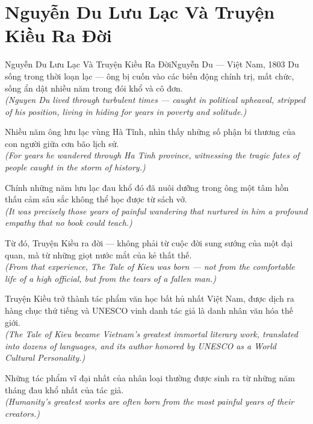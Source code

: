 \section{Nguyễn Du Lưu Lạc Và Truyện Kiều Ra Đời}
\begin{truyen}{Nguyễn Du Lưu Lạc Và Truyện Kiều Ra Đời}{Nguyễn Du --- Việt Nam, 1803}
 Du sống trong thời loạn lạc --- ông bị cuốn vào các biến động chính trị, mất chức, sống ẩn dật nhiều năm trong đói khổ và cô đơn.\\[4pt]
\textit{(Nguyen Du lived through turbulent times --- caught in political upheaval, stripped of his position, living in hiding for years in poverty and solitude.)}

Nhiều năm ông lưu lạc vùng Hà Tĩnh, nhìn thấy những số phận bi thương của con người giữa cơn bão lịch sử.\\[4pt]
\textit{(For years he wandered through Ha Tinh province, witnessing the tragic fates of people caught in the storm of history.)}

Chính những năm lưu lạc đau khổ đó đã nuôi dưỡng trong ông một tâm hồn thấu cảm sâu sắc không thể học được từ sách vở.\\[4pt]
\textit{(It was precisely those years of painful wandering that nurtured in him a profound empathy that no book could teach.)}

Từ đó, Truyện Kiều ra đời --- không phải từ cuộc đời sung sướng của một đại quan, mà từ những giọt nước mắt của kẻ thất thế.\\[4pt]
\textit{(From that experience, The Tale of Kieu was born --- not from the comfortable life of a high official, but from the tears of a fallen man.)}

Truyện Kiều trở thành tác phẩm văn học bất hủ nhất Việt Nam, được dịch ra hàng chục thứ tiếng và UNESCO vinh danh tác giả là danh nhân văn hóa thế giới.\\[4pt]
\textit{(The Tale of Kieu became Vietnam's greatest immortal literary work, translated into dozens of languages, and its author honored by UNESCO as a World Cultural Personality.)}

\end{truyen}
\begin{baihoc}
  Những tác phẩm vĩ đại nhất của nhân loại thường được sinh ra từ những năm tháng đau khổ nhất của tác giả.\\[4pt]
  \textit{(Humanity's greatest works are often born from the most painful years of their creators.)}
\end{baihoc}
